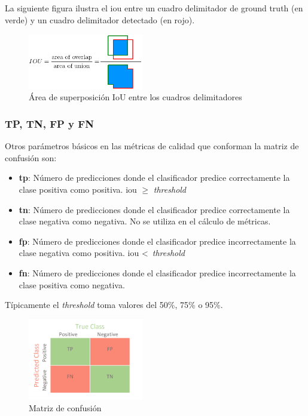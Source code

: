 La siguiente figura ilustra el \gls{iou} entre un cuadro delimitador de ground truth (en verde) y un cuadro delimitador detectado (en rojo).

\begin{figure}[ht]
\centering
\includegraphics[width=0.45\textwidth]{img/chapters/resultados/metricas/iou.png}
\caption{\label{fig:iou}Área de superposición IoU entre los cuadros delimitadores}
\end{figure}

\subsubsection{TP, TN, FP y FN}
\label{subsubsec:tp+tn+fp+fn}

Otros parámetros básicos en las métricas de calidad que conforman la matriz de confusión \cite{confusion-matrix} son:

\begin{itemize}
    \item \textbf{\gls{tp}}: Número de predicciones donde el clasificador predice correctamente la clase positiva como positiva. \gls{iou} $\geqslant$ \textit{threshold}
    \item \textbf{\gls{tn}}: Número de predicciones donde el clasificador predice correctamente la clase negativa como negativa. No se utiliza en el cálculo de métricas.
    \item \textbf{\gls{fp}}: Número de predicciones donde el clasificador predice incorrectamente la clase negativa como positiva. \gls{iou} <\ \textit{threshold}
    \item \textbf{\gls{fn}}: Número de predicciones donde el clasificador predice incorrectamente la clase positiva como negativa.
\end{itemize}

Típicamente el \textit{threshold} toma valores del 50\%, 75\% o 95\%.

\begin{figure}[ht]
\centering
\includegraphics[width=0.45\textwidth]{img/chapters/resultados/metricas/confusion-matrix.png}
\caption{\label{fig:confusion-matrix}Matriz de confusión}
\end{figure}

